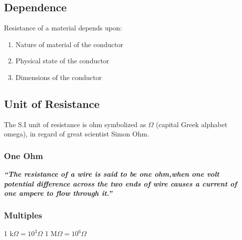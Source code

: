\subsection*{Dependence}
Resistance of a material depends upon:
\begin{enumerate}[label=(\roman*)] 
 \item Nature of material of the conductor
 \item Physical state of the conductor
 \item Dimensions of the conductor
 \end{enumerate}
 \subsection*{Unit of Resistance}
 The S.I unit of resistance is ohm symbolized as $\Omega$
 (capital Greek alphabet omega), in regard of great scientist Simon Ohm.
\subsubsection{One Ohm}
\textit{\textbf{``The resistance of a wire is said to be one ohm,when one volt potential difference across the two ends of wire causes a current of one ampere to flow through it.”}}
\subsubsection{Multiples}
\begin{center}
    1 k$\Omega = 10^{3} \Omega$
    1 M$\Omega = 10^{6} \Omega$ 
\end{center}
